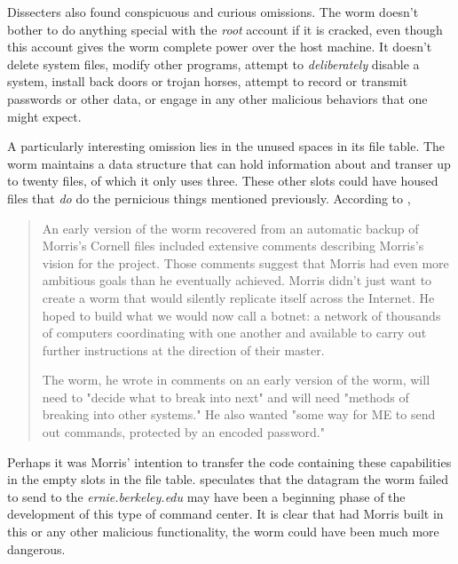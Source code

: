 Dissecters also found conspicuous and curious omissions. The worm doesn't bother
to do anything special with the \textit{root} account if it is cracked, even
though this account gives the worm complete power over the host machine.
It doesn't delete system files, modify other programs, attempt to
\textit{deliberately} disable a system, install back doors or trojan horses,
attempt to record or transmit passwords or other data, or engage in any other
malicious behaviors that one might expect. 

A particularly interesting omission lies in the unused spaces in its file table.
The worm maintains a data structure that can hold information about and transer
up to twenty files, of which it only uses three. These other slots could have
housed files that \textit{do} do the pernicious things
mentioned previously. According to \cite{lee_washpost_2013},

\begin{quote}
An early version of the worm recovered from an automatic backup of Morris's
Cornell files included extensive comments describing Morris's vision for the
project. Those comments suggest that Morris had even more ambitious goals than
he eventually achieved. Morris didn't just want to create a worm that would
silently replicate itself across the Internet. He hoped to build what we would
now call a botnet: a network of thousands of computers coordinating with one
another and available to carry out further instructions at the direction of
their master.

The worm, he wrote in comments on an early version of the worm, will need to
"decide what to break into next" and will need "methods of breaking into other
systems." He also wanted "some way for ME to send out commands, protected by an
encoded password."
\end{quote}

Perhaps it was Morris' intention to transfer the code containing these
capabilities in the empty slots in the file table. \cite{lee_washpost_2013}
speculates that the datagram the worm failed to send to the 
\textit{ernie.berkeley.edu} may have been a beginning phase of the development
of this type of command center. It is clear that had Morris built in this or
any other malicious functionality, the worm could have been much more dangerous. 
